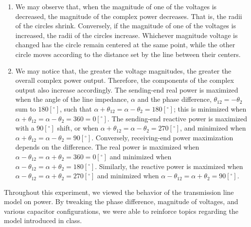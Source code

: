 \documentclass[
	letterpaper, %
	10pt, %
]{CSUniSchoolLabReport}
\begin{document}
\begin{enumerate}

  \item We may observe that, when the magnitude of one of the voltages is decreased, the magnitude of the complex power decreases. That is, the radii of the circles shrink. Conversely, if the magnitude of one of the voltages is increased, the radii of the circles increase. Whichever magnitude voltage is changed has the circle remain centered at the same point, while the other circle moves according to the distance set by the line between their centers.

  \item We may notice that, the greater the voltage magnitudes, the greater the overall complex power output. Therefore, the components of the complex output also increase accordingly. The sending-end real power is maximized when the angle of the line impedance, $\alpha$ and the phase difference, $\theta_{12}=-\theta_2$ sum to $180[^{\circ}]$, such that $\alpha+\theta_{12}=\alpha-\theta_{2}=180[^{\circ}]$; this is minimized when $\alpha+\theta_{12}=\alpha-\theta_{2}=360=0[^{\circ}]$. The sending-end reactive power is maximized with a $90[^{\circ}]$ shift, or when $\alpha+\theta_{12}=\alpha-\theta_{2}=270[^{\circ}]$, and minimized when $\alpha+\theta_{12}=\alpha-\theta_{2}=90[^{\circ}]$. Conversely, receiving-end power maximization depends on the difference. The real power is maximized when $\alpha-\theta_{12}=\alpha+\theta_{2}=360=0[^{\circ}]$ and minimized when $\alpha-\theta_{12}=\alpha+\theta_{2}=180[^{\circ}]$. Similarly, the reactive power is maximized when $\alpha-\theta_{12}=\alpha+\theta_{2}=270[^{\circ}]$ and minimized when $\alpha-\theta_{12}=\alpha+\theta_{2}=90[^{\circ}]$.\\

\end{enumerate}

Throughout this experiment, we viewed the behavior of the transmission line model on power. By tweaking the phase difference, magnitude of voltages, and various capacitor configurations, we were able to reinforce topics regarding the model introduced in class.
\end{document}
